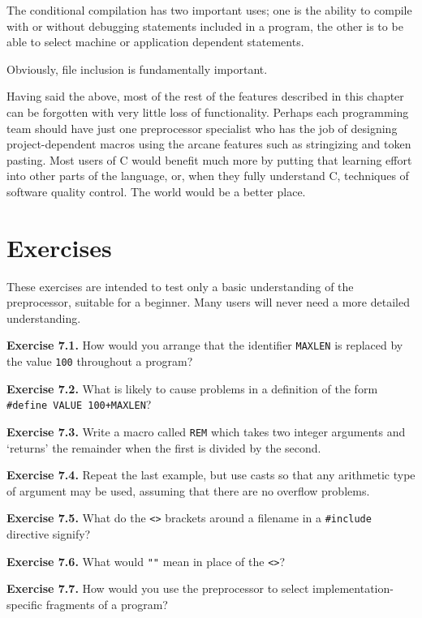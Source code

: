   The conditional compilation has two important uses; one is the
   ability to compile with or without debugging statements included in
   a program, the other is to be able to select machine or application
   dependent statements.


  Obviously, file inclusion is fundamentally important.


  Having said the above, most of the rest of the features described in
   this chapter can be forgotten with very little loss of functionality.
   Perhaps each programming team should have just one preprocessor
   specialist who has the job of designing project-dependent macros using
   the arcane features such as stringizing and token pasting. Most users
   of C would benefit much more by putting that learning effort into other
   parts of the language, or, when they fully understand C, techniques of
   software quality control. The world would be a better place.


 
        \section{Exercises}
        


  These exercises are intended to test only a basic understanding of
   the preprocessor, suitable for a beginner. Many users will never
   need a more detailed understanding.


  \textbf{Exercise 7.1.} How would you arrange that the identifier
   \texttt{MAXLEN} is replaced by the value \texttt{100} throughout
   a program?


  \textbf{Exercise 7.2.} What is likely to cause problems in a definition of
   the form \texttt{\#define VALUE 100+MAXLEN}?


  \textbf{Exercise 7.3.} Write a macro called \texttt{REM} which takes
   two integer arguments and `returns' the remainder when the first
   is divided by the second.


  \textbf{Exercise 7.4.} Repeat the last example, but use casts so that any
   arithmetic type of argument may be used, assuming that there are no
   overflow problems.


  \textbf{Exercise 7.5.} What do the \texttt{<>} brackets around
   a filename in a \texttt{\#include} directive signify?


  \textbf{Exercise 7.6.} What would \texttt{""} mean in place of
   the \texttt{<>}?


  \textbf{Exercise 7.7.} How would you use the preprocessor to select
   implementation-specific fragments of a program?


